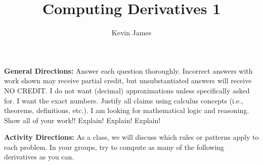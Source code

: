 \documentclass[handout,nooutcomes,noauthor,12pt]{ximera}
\author{Kevin James}
\title{Computing Derivatives 1}
\begin{document}
	\textbf{General Directions:}  Answer each question thoroughly.  Incorrect answers with work shown may receive partial credit, but unsubstantiated answers will receive NO CREDIT.  I do not want (decimal) approximations unless specifically asked for.  I want the exact numbers.  Justify all claims using calculus concepts (i.e., theorems, definitions, etc.).  I am looking for mathematical logic and reasoning.  Show all of your work!! Explain!  Explain!  Explain!
	
	\textbf{Activity Directions:}  As a class, we will discuss which rules or patterns apply to each problem.  In your groups, try to compute as many of the following derivatives as you can.
\end{document}
